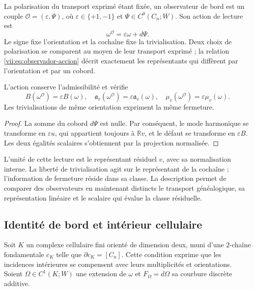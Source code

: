 \begin{definition}
\label{vii:def:observador-borde}
La polarisation du transport exprimé étant fixée, un observateur de bord est un couple \(\mathcal O=(\varepsilon,\Psi)\), où \(\varepsilon\in\{+1,-1\}\) et \(\Psi\in C^0(C_n;W)\). Son action de lecture est
\begin{equation}
 \omega^{\mathcal O}=\varepsilon\omega+d\Psi.
 \label{vii:eq:observador-accion}
\end{equation}
Le signe fixe l'orientation et la cochaîne fixe la trivialisation. Deux choix de polarisation se comparent au moyen de leur transport exprimé ; la relation \eqref{vii:eq:observador-accion} décrit exactement les représentants qui diffèrent par l'orientation et par un cobord.
\end{definition}

\begin{proposition}
\label{vii:prop:observador-covarianza}
L'action conserve l'admissibilité et vérifie
\[
 B(\omega^{\mathcal O})=\varepsilon B(\omega),\quad
 \mathfrak a_v(\omega^{\mathcal O})=\varepsilon\mathfrak a_v(\omega),
 \quad \mu_v(\omega^{\mathcal O})=\varepsilon\mu_v(\omega).
\]
Les trivialisations de même orientation expriment la même fermeture.
\end{proposition}

\begin{proof}
La somme du cobord \(d\Psi\) est nulle. Par conséquent, le mode harmonique
se transforme en \(\varepsilon u\), qui appartient toujours à
\(\mathbb Rv\), et le défaut se transforme en \(\varepsilon B\).
Les deux égalités scalaires s'obtiennent par la projection normalisée.
\end{proof}

L'unité de cette lecture est le représentant résiduel \(v\), avec sa normalisation interne. La liberté de trivialisation agit sur le représentant de la cochaîne ; l'information de fermeture réside dans sa classe. La description permet de comparer des observateurs en maintenant distincts le transport généalogique, sa représentation linéaire et le scalaire qui évalue la classe résiduelle.

\subsection{Identité de bord et intérieur cellulaire}
\label{vii:sec:observador-stokes}

Soit \(K\) un complexe cellulaire fini orienté de dimension deux,
muni d'une \(2\)-chaîne fondamentale \(c_K\) telle que
\(\partial c_K=[C_n]\). Cette condition exprime que les incidences
intérieures se compensent avec leurs multiplicités et orientations.
Soient \(\Omega\in C^1(K;W)\) une extension de \(\omega\) et
\(F_\Omega=d\Omega\) sa courbure discrète additive.

